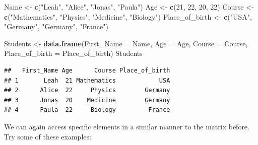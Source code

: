 \documentclass[
]{book}
\newenvironment{Shaded}{\begin{snugshade}}{\end{snugshade}}
\newcommand{\AttributeTok}[1]{\textcolor[rgb]{0.13,0.29,0.53}{#1}}
\newcommand{\CommentTok}[1]{\textcolor[rgb]{0.56,0.35,0.01}{\textit{#1}}}
\newcommand{\DecValTok}[1]{\textcolor[rgb]{0.00,0.00,0.81}{#1}}
\newcommand{\FunctionTok}[1]{\textcolor[rgb]{0.13,0.29,0.53}{\textbf{#1}}}
\newcommand{\NormalTok}[1]{#1}
\newcommand{\OtherTok}[1]{\textcolor[rgb]{0.56,0.35,0.01}{#1}}
\newcommand{\SpecialCharTok}[1]{\textcolor[rgb]{0.81,0.36,0.00}{\textbf{#1}}}
\newcommand{\StringTok}[1]{\textcolor[rgb]{0.31,0.60,0.02}{#1}}
\begin{document}
\begin{Shaded}
\begin{Highlighting}[]
\NormalTok{Name }\OtherTok{\textless{}{-}} \FunctionTok{c}\NormalTok{(}\StringTok{"Leah"}\NormalTok{, }\StringTok{"Alice"}\NormalTok{, }\StringTok{"Jonas"}\NormalTok{, }\StringTok{"Paula"}\NormalTok{)}
\NormalTok{Age }\OtherTok{\textless{}{-}} \FunctionTok{c}\NormalTok{(}\DecValTok{21}\NormalTok{, }\DecValTok{22}\NormalTok{, }\DecValTok{20}\NormalTok{, }\DecValTok{22}\NormalTok{)}
\NormalTok{Course }\OtherTok{\textless{}{-}} \FunctionTok{c}\NormalTok{(}\StringTok{"Mathematics"}\NormalTok{, }\StringTok{"Physics"}\NormalTok{, }\StringTok{"Medicine"}\NormalTok{, }\StringTok{"Biology"}\NormalTok{)}
\NormalTok{Place\_of\_birth }\OtherTok{\textless{}{-}} \FunctionTok{c}\NormalTok{(}\StringTok{"USA"}\NormalTok{, }\StringTok{"Germany"}\NormalTok{, }\StringTok{"Germany"}\NormalTok{, }\StringTok{"France"}\NormalTok{)}

\NormalTok{Students }\OtherTok{\textless{}{-}} \FunctionTok{data.frame}\NormalTok{(}\AttributeTok{First\_Name =}\NormalTok{ Name, }
                       \AttributeTok{Age =}\NormalTok{ Age, }
                       \AttributeTok{Course =}\NormalTok{ Course,}
                       \AttributeTok{Place\_of\_birth =}\NormalTok{ Place\_of\_birth)}
\NormalTok{Students}
\end{Highlighting}
\end{Shaded}

\begin{verbatim}
##   First_Name Age      Course Place_of_birth
## 1       Leah  21 Mathematics            USA
## 2      Alice  22     Physics        Germany
## 3      Jonas  20    Medicine        Germany
## 4      Paula  22     Biology         France
\end{verbatim}

We can again access specific elements in a similar manner to the matrix before.
Try some of these examples:

\begin{Shaded}
\end{Shaded}
\end{document}
